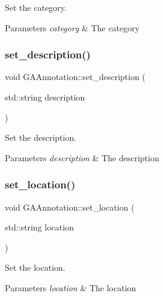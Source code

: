Set the category. 


\begin{DoxyParams}{Parameters}
{\em category} & The category \\
\hline
\end{DoxyParams}
\mbox{\label{class_g_a_annotation_acd71dcf44798cafa6e9d90d3336beb81}} 
\subsubsection{\texorpdfstring{set\+\_\+description()}{set\_description()}}
{\footnotesize\ttfamily void G\+A\+Annotation\+::set\+\_\+description (\begin{DoxyParamCaption}\item[{std\+::string}]{description }\end{DoxyParamCaption})}



Set the description. 


\begin{DoxyParams}{Parameters}
{\em description} & The description \\
\hline
\end{DoxyParams}
\mbox{\label{class_g_a_annotation_ac7f751a3088ec6e584c3b18d100cd83a}} 
\subsubsection{\texorpdfstring{set\+\_\+location()}{set\_location()}}
{\footnotesize\ttfamily void G\+A\+Annotation\+::set\+\_\+location (\begin{DoxyParamCaption}\item[{std\+::string}]{location }\end{DoxyParamCaption})}



Set the location. 


\begin{DoxyParams}{Parameters}
{\em location} & The location \\
\hline
\end{DoxyParams}
\mbox{\label{class_g_a_annotation_a651fe6a772d668356be8f185175b85e2}} 
